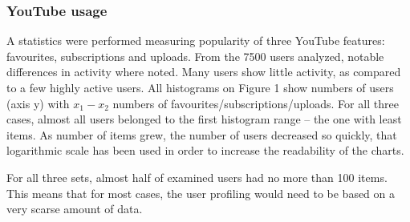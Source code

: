 \subsubsection{YouTube usage}

A statistics were performed measuring popularity of three YouTube features: favourites,
subscriptions and uploads. From the 7500 users analyzed, notable differences in activity
where noted. Many users show little activity, as compared to a few highly active users.
All histograms on Figure 1 show numbers of users
(axis y) with $x_1-x_2$ numbers of favourites/subscriptions/uploads. For all
three cases, almost all users belonged to the first histogram range -- the one
with least items. As number of items grew, the number of users decreased so
quickly, that logarithmic scale has been used in order to increase the readability of the
charts.

For all three sets, almost half of examined users had no more than 100 items.
This means that for most cases, the user profiling would need to be based on a very
scarse amount of data.


